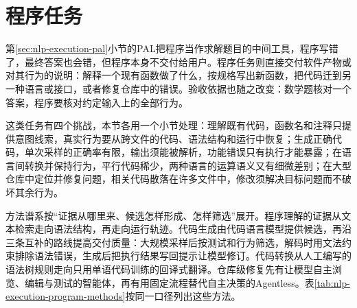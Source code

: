 \section{程序任务}
\label{sec:nlp-execution-programs}

第\ref{sec:nlp-execution-pal}小节的PAL把程序当作求解题目的中间工具，程序写错了，最终答案也会错，但程序本身不交付给用户。程序任务则直接交付软件产物或对其行为的说明：解释一个现有函数做了什么，按规格写出新函数，把代码迁到另一种语言或接口，或者修复仓库中的错误。验收依据也随之改变：数学题核对一个答案，程序要核对约定输入上的全部行为。

这类任务有四个挑战，本节各用一个小节处理：理解既有代码，函数名和注释只提供意图线索，真实行为要从跨文件的代码、语法结构和运行中恢复；生成正确代码，单次采样的正确率有限，输出须能被解析，功能错误只有执行才能暴露；在语言间转换并保持行为，平行代码稀少，两种语言的运算语义又有细微差别；在大型仓库中定位并修复问题，相关代码散落在许多文件中，修改须解决目标问题而不破坏其余行为。

方法谱系按“证据从哪里来、候选怎样形成、怎样筛选”展开。程序理解的证据从文本检索走向语法结构，再走向运行轨迹。代码生成由代码语言模型提供候选，再沿三条互补的路线提高交付质量：大规模采样后按测试和行为筛选，解码时用文法约束排除语法错误，生成后把执行结果写回提示让模型修订。代码转换从人工编写的语法树规则走向只用单语代码训练的回译式翻译。仓库级修复先有让模型自主浏览、编辑与测试的智能体，再有用固定流程替代自主决策的Agentless。表\ref{tab:nlp-execution-program-methods}按同一口径列出这些方法。

